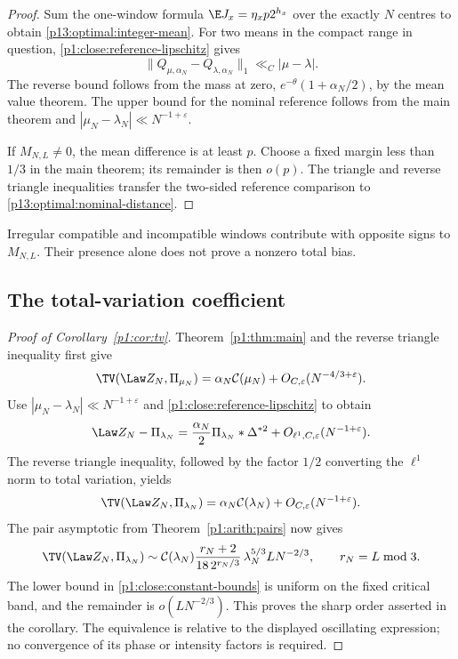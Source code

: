 \begin{proof}
Sum the one-window formula
\(\E J_x=\eta_xp2^{h_x}\) over the exactly \(N\)
centres to obtain \eqref{p13:optimal:integer-mean}.
For two means in the compact range in question,
\eqref{p1:close:reference-lipschitz} gives
\[
 \|Q_{\mu,\alpha_N}-Q_{\lambda,\alpha_N}\|_1
 \ll_C|\mu-\lambda|.
\]
The reverse bound follows from the mass at zero,
\(e^{-\theta}(1+\alpha_N/2)\), by the mean value theorem.
The upper bound for the nominal reference follows
from the main theorem and
\(|\mu_N-\lambda_N|\ll N^{-1+\varepsilon}\).

If \(M_{N,L}\ne0\), the mean difference is at least \(p\).
Choose a fixed margin less than \(1/3\) in the main
theorem; its remainder is then \(o(p)\).
The triangle and reverse triangle inequalities transfer
the two-sided reference comparison to
\eqref{p13:optimal:nominal-distance}.
\end{proof}

Irregular compatible and incompatible windows contribute
with opposite signs to \(M_{N,L}\). Their presence alone
does not prove a nonzero total bias.

\subsection{The total-variation coefficient}
\label{p14:comp:tv}

\begin{proof}[Proof of Corollary~\ref{p1:cor:tv}]
Theorem~\ref{p1:thm:main} and the reverse triangle
inequality first give
\[
 \TV(\Law Z_N,\Pi_{\mu_N})
 =\alpha_N\mathcal C(\mu_N)
            +O_{C,\varepsilon}(N^{-4/3+\varepsilon}).
\]
Use \(|\mu_N-\lambda_N|\ll N^{-1+\varepsilon}\) and
\eqref{p1:close:reference-lipschitz} to obtain
\[
 \Law Z_N-\Pi_{\lambda_N}
   =\frac{\alpha_N}{2}\Pi_{\lambda_N}*\Delta^{*2}
          +O_{\ell^1,C,\varepsilon}(N^{-1+\varepsilon}).
\]
The reverse triangle inequality, followed by the factor
$1/2$ converting the $\ell^1$ norm to total variation,
yields
\begin{equation}
 \TV(\Law Z_N,\Pi_{\lambda_N})
      =\alpha_N\mathcal C(\lambda_N)
          +O_{C,\varepsilon}(N^{-1+\varepsilon}).
 \label{p1:close:tv-exact-parameter}
\end{equation}
The pair asymptotic from
Theorem~\ref{p1:arith:pairs} now gives
\begin{equation}
 \TV(\Law Z_N,\Pi_{\lambda_N})
 \sim \mathcal C(\lambda_N)
       \frac{r_N+2}{18\,2^{r_N/3}}\,
       \lambda_N^{5/3}L N^{-2/3},
 \qquad r_N=L\bmod3.
 \label{p1:close:tv-asymptotic}
\end{equation}
The lower bound in \eqref{p1:close:constant-bounds} is uniform
on the fixed critical band, and the remainder is
$o(LN^{-2/3})$.  This proves the sharp order asserted in the
corollary.  The equivalence is relative to the displayed
oscillating expression; no convergence of its phase or
intensity factors is required.
\end{proof}

